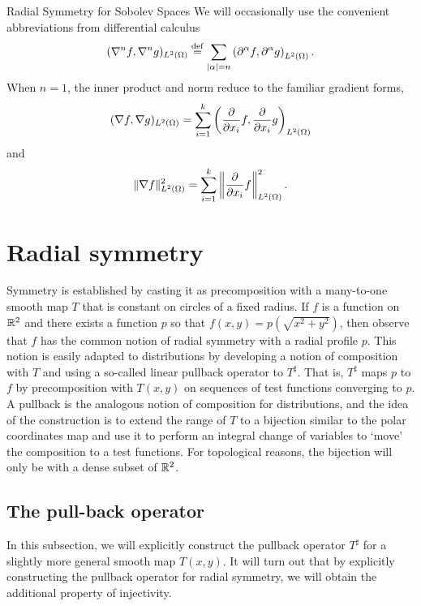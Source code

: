 \begin{chapter}{Radial Symmetry for Sobolev Spaces}
We will occasionally use the convenient abbreviations from differential calculus
\begin{equation}
  (\nabla^n f,\nabla^n g)_{L^2(\Omega)} \stackrel{\rm def}{=} \sum_{|\alpha|= n} \left(\partial^\alpha f,\partial^\alpha g\right)_{L^2(\Omega)}.
\end{equation}
When $n=1$, the inner product and norm reduce to the familiar gradient forms,
\begin{equation}
  (\nabla f,\nabla g)_{L^2(\Omega)} = \sum_{i=1}^k \left(\frac{\partial}{\partial x_i} f,\frac{\partial}{\partial x_i} g\right)_{L^2(\Omega)}
\end{equation}
and 
\begin{equation}
  \|\nabla f\|^2_{L^2(\Omega)} = \sum_{i=1}^k\left\| \frac{\partial}{\partial x_i}f\right\|^2_{L^2(\Omega)}.
\end{equation}

\section{Radial symmetry}
Symmetry is established by casting it as precomposition with a many-to-one smooth map $T$ that is constant on circles of a fixed radius.  
If $f$ is a function on $\mathbb R^2$ and there exists a function $p$ so that $f(x,y) = p(\sqrt{x^2 + y^2})$, then observe that $f$ has the common notion of radial symmetry with a radial profile $p$.
This notion is easily adapted to distributions by developing a notion of composition with $T$ and using a so-called linear pullback operator to $T^\sharp$.
That is, $T^\sharp$ maps $p$ to $f$ by precomposition with $T(x,y)$ on sequences of test functions converging to $p$.
A pullback is the analogous notion of composition for distributions, and the idea of the construction is to extend the range of $T$ to a bijection similar to the polar coordinates map and use it to perform an integral change of variables to `move' the composition to a test functions.
For topological reasons, the bijection will only be with a dense subset of $\mathbb R^2$.

\subsection{The pull-back operator}
In this subsection, we will explicitly construct the pullback operator $T^\sharp$ for a slightly more general smooth map $T(x,y)$. 
It will turn out that by explicitly constructing the pullback operator for radial symmetry, we will obtain the additional property of injectivity.


\end{chapter}
